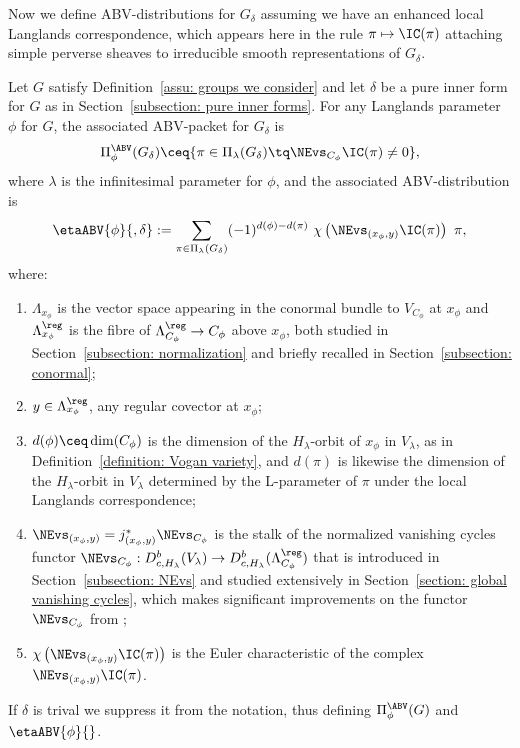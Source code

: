 \documentclass[11pt,letterpaper]{amsart}
\numberwithin{equation}{section}
\begin{document}
Now we define ABV-distributions for $G_\delta$ assuming we have an enhanced local Langlands correspondence, which appears here in the rule $\pi \mapsto \IC(\pi)$ attaching simple perverse sheaves to irreducible smooth representations of $G_\delta$.

\begin{definition}
Let $G$ satisfy Definition~\ref{assu: groups we consider} and let $\delta$ be a pure inner form for $G$ as in Section~\ref{subsection: pure inner forms}.
For any Langlands parameter $\phi$ for $G$, the associated ABV-packet for $G_\delta$ is
\begin{equation}\label{intro: definition of ABV-packet}
\Pi^\ABV_\phi(G_\delta)
\ceq
\{
\pi\in \Pi_\lambda(G_\delta) \tq \NEvs_{C_\phi} \IC(\pi) \ne 0
\},
\end{equation}
where $\lambda$ is the infinitesimal parameter for $\phi$, and the associated ABV-distribution is
\begin{equation}\label{intro: definition of ABV stable}
\etaABV{\phi}{,\delta}
:=
\sum_{\pi\in \Pi_\lambda(G_\delta)}
(-1)^{d(\phi)-d(\pi)} 
\
\chi\left(\NEvs_{(x_\phi,y)}\IC(\pi)\right)\ \pi, 
\end{equation}
where:
\begin{enumerate}
    \item 
    $\Lambda_{x_\phi}$ is the vector space appearing in the conormal bundle to $V_{C_\phi}$ at $x_\phi$ and $\Lambda_{x_\phi}^\reg$ is the fibre of $\Lambda^\reg_{C_\phi} \to C_\phi$ above $x_\phi$, both studied in Section~\ref{subsection: normalization} and briefly recalled in Section~\ref{subsection: conormal};
    \item $y\in \Lambda_{x_\phi}^\reg$, any regular covector at ${x_\phi}$;
    \item 
    $d(\phi)\ceq \dim (C_\phi)$ is the dimension of the $H_\lambda$-orbit of $x_\phi$ in $V_\lambda$, as in Definition~\ref{definition: Vogan variety}, and $d(\pi)$ is likewise the dimension of the $H_\lambda$-orbit in $V_\lambda$ determined by the L-parameter of $\pi$ under the local Langlands correspondence; 
    \item 
    $\NEvs_{(x_\phi,y)} = j^*_{(x_\phi,y)} \NEvs_{C_\phi}$ is the stalk of the normalized vanishing cycles functor $\NEvs_{C_\phi} : D^b_{c,H_\lambda}(V_\lambda) \to D^b_{c,H_\lambda}(\Lambda^\reg_{C_\phi})$ that is introduced in Section~\ref{subsection: NEvs} and studied extensively in Section~\ref{section: global vanishing cycles}, which makes significant improvements on the functor $\NEvs_{C_\phi}$ from \cite{CFMMX22};
    \item 
    $\chi\left(\NEvs_{(x_\phi,y)}\IC(\pi)\right)$ is the Euler characteristic of the complex $\NEvs_{(x_\phi,y)}\IC(\pi)$.
    \end{enumerate}
If $\delta$ is trival we suppress it from the notation, thus defining $\Pi_\phi^\ABV(G)$ and $\etaABV{\phi}{}$.
\end{definition}
\end{document}

